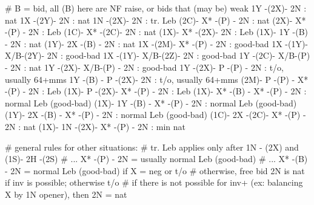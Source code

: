 # B = bid, all (B) here are NF raise, or bids that (may be) weak
 1Y -(2X)- 2N : nat
 1X -(2Y)- 2N : nat
 1N -(2X)- 2N : tr. Leb
(2C)- X* -(P) - 2N : nat
(2X)- X* -(P) - 2N : Leb
(1C)- X* -(2C)- 2N : nat
(1X)- X* -(2X)- 2N : Leb 
(1X)- 1Y -(B) - 2N : nat
(1Y)- 2X -(B) - 2N : nat
 1X -(2M)- X* -(P) - 2N : good-bad
 1X -(1Y)- X/B-(2Y)- 2N : good-bad
 1X -(1Y)- X/B-(2Z)- 2N : good-bad 
 1Y -(2C)- X/B-(P) - 2N : nat 
 1Y -(2X)- X/B-(P) - 2N : good-bad
 1Y -(2X)- P  -(P) - 2N : t/o, usually 64+mms
 1Y -(B) - P  -(2X)- 2N : t/o, usually 64+mms
(2M)- P  -(P) - X* -(P) - 2N : Leb
(1X)- P  -(2X)- X* -(P) - 2N : Leb
(1X)- X* -(B) - X* -(P) - 2N : normal Leb (good-bad)
(1X)- 1Y -(B) - X* -(P) - 2N : normal Leb (good-bad)
(1Y)- 2X -(B) - X* -(P) - 2N : normal Leb (good-bad)
(1C)- 2X -(2C)- X* -(P) - 2N : nat
(1X)- 1N -(2X)- X* -(P) - 2N : min nat

# general rules for other situations: 
# tr. Leb applies only after 1N - (2X) and (1S)- 2H -(2S)
# ... X* -(P) - 2N = usually normal Leb (good-bad)
# ... X* -(B) - 2N = normal Leb (good-bad) if X = neg or t/o
# otherwise, free bid 2N is nat if inv is possible; otherwise t/o
# if there is not possible for inv+ (ex: balancing X by 1N opener), then 2N = nat